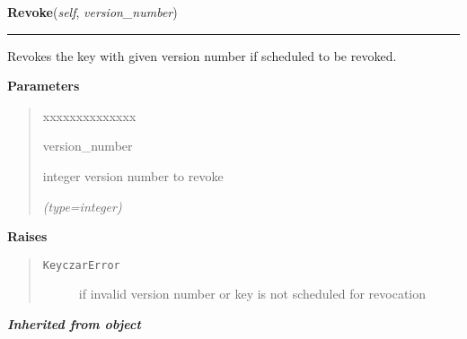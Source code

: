     \label{keyczar:keyczar:Keyczar:Revoke}

    \vspace{0.5ex}

\hspace{.8\funcindent}\begin{boxedminipage}{\funcwidth}

    \raggedright \textbf{Revoke}(\textit{self}, \textit{version\_number})

    \vspace{-1.5ex}

    \rule{\textwidth}{0.5\fboxrule}
\setlength{\parskip}{2ex}
    Revokes the key with given version number if scheduled to be revoked.

\setlength{\parskip}{1ex}
      \textbf{Parameters}
      \vspace{-1ex}

      \begin{quote}
        \begin{Ventry}{xxxxxxxxxxxxxx}

          \item[version\_number]

          integer version number to revoke

            {\it (type=integer)}

        \end{Ventry}

      \end{quote}

      \textbf{Raises}
    \vspace{-1ex}

      \begin{quote}
        \begin{description}

          \item[\texttt{KeyczarError}]

          if invalid version number or key is not scheduled for revocation

        \end{description}

      \end{quote}

    \end{boxedminipage}


\large{\textbf{\textit{Inherited from object}}}

